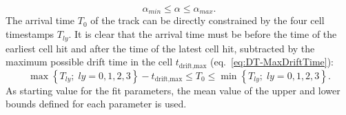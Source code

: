\begin{equation}
    \alpha_{min} \leq \alpha \leq \alpha_{max} .
    \label{eq:SLPatternFit-alphax-bounds}
\end{equation}
The arrival time $T_0$ of the track can be directly constrained by the four cell timestamps $T_{ly}$. It is clear that the arrival time must be before the time of the earliest cell hit and after the time of the latest cell hit, subtracted by the maximum possible drift time in the cell $t_\text{drift,max}$ (eq.\ \ref{eq:DT-MaxDriftTime}):
\begin{equation}
    \max \left\{ T_{ly} ; \; ly=0,1,2,3 \right\} - t_\text{drift,max} 
    \leq T_0 \leq
    \min \left\{ T_{ly} ; \; ly=0,1,2,3 \right\} .
    \label{eq:SLPatternFit-t0-bounds}
\end{equation}
As starting value for the fit parameters, the mean value of the upper and lower bounds defined for each parameter is used.
